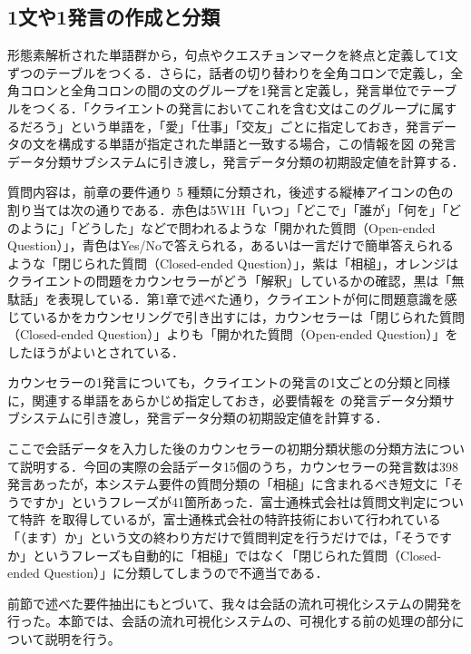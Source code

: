 \documentclass[shuuron]{kuee}
\begin{document}
\subsection{1文や1発言の作成と分類}
形態素解析された単語群から，句点やクエスチョンマークを終点と定義して1文ずつのテーブルをつくる．さらに，話者の切り替わりを全角コロンで定義し，全角コロンと全角コロンの間の文のグループを1発言と定義し，発言単位でテーブルをつくる．「クライエントの発言においてこれを含む文はこのグループに属するだろう」という単語を，「愛」「仕事」「交友」ごとに指定しておき，発言データの文を構成する単語が指定された単語と一致する場合，この情報を図
の発言データ分類サブシステムに引き渡し，発言データ分類の初期設定値を計算する．



質問内容は，前章の要件通り 5 種類に分類され，後述する縦棒アイコンの色の割り当ては次の通りである．赤色は5W1H「いつ」「どこで」「誰が」「何を」「どのように」「どうした」などで問われるような「開かれた質問（Open-ended Question）」，青色はYes/Noで答えられる，あるいは一言だけで簡単答えられるような「閉じられた質問（Closed-ended Question）」，紫は「相槌」，オレンジはクライエントの問題をカウンセラーがどう「解釈」しているかの確認，黒は「無駄話」を表現している．第1章で述べた通り，クライエントが何に問題意識を感じているかをカウンセリングで引き出すには，カウンセラーは「閉じられた質問（Closed-ended Question）」よりも「開かれた質問（Open-ended Question）」をしたほうがよいとされている．


カウンセラーの1発言についても，クライエントの発言の1文ごとの分類と同様に，関連する単語をあらかじめ指定しておき，必要情報を
の発言データ分類サブシステムに引き渡し，発言データ分類の初期設定値を計算する．

ここで会話データを入力した後のカウンセラーの初期分類状態の分類方法について説明する．今回の実際の会話データ15個のうち，カウンセラーの発言数は398発言あったが，本システム要件の質問分類の「相槌」に含まれるべき短文に「そうですか」というフレーズが41箇所あった．富士通株式会社は質問文判定について特許
を取得しているが，富士通株式会社の特許技術において行われている「（ます）か」という文の終わり方だけで質問判定を行うだけでは，「そうですか」というフレーズも自動的に「相槌」ではなく「閉じられた質問（Closed-ended Question）」に分類してしまうので不適当である．



前節で述べた要件抽出にもとづいて、我々は会話の流れ可視化システムの開発を行った。本節では、会話の流れ可視化システムの、可視化する前の処理の部分について説明を行う。
\end{document}

